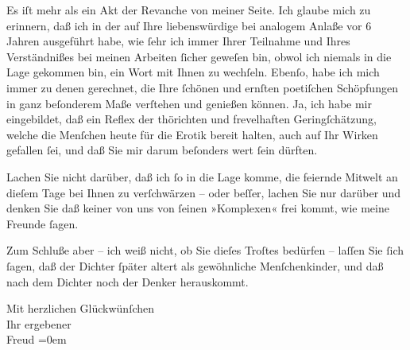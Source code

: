 \pstart
           Es iſt mehr als ein Akt der Revanche von meiner Seite. Ich glaube mich zu erinnern,
               daß ich in der \label{K_L03886-2v}\label{K_L03886-2} auf Ihre liebenswürdige
                  \label{K_L03886-3v}\label{K_L03886-3} bei analogem Anlaße vor 6
               Jahren ausgeführt habe, wie ſehr ich immer Ihrer Teilnahme und Ihres Verständnißes
               bei meinen Arbeiten ſicher geweſen bin, obwol ich niemals in die Lage gekommen bin,
               ein Wort mit Ihnen zu wechſeln. Ebenſo, habe ich mich immer zu denen gerechnet, die
               Ihre ſchönen und ernſten poetiſchen Schöpfungen in ganz beſonderem Maße verſtehen und
               genießen können. Ja, ich habe mir eingebildet, daß ein Reflex der thörichten und
               frevelhaften Gering{\pb}ſchätzung, welche die Menſchen
               heute für die Erotik bereit halten, auch auf Ihr Wirken gefallen ſei, und daß Sie mir
               darum beſonders wert ſein dürften.\pend
           
\pstart
           Lachen Sie nicht darüber, daß ich ſo in die Lage komme, die feiernde Mitwelt an
               dieſem Tage bei Ihnen zu verſchwärzen – oder beſſer, lachen Sie nur darüber und
               denken Sie daß keiner von uns von ſeinen »Komplexen« frei kommt, wie meine Freunde
               ſagen.\pend
           
\pstart
           Zum Schluße aber – ich weiß nicht, ob Sie dieſes Troſtes bedürfen – laſſen Sie ſich
               ſagen, daß der Dichter ſpäter altert als gewöhnliche Menſchenkinder, und daß nach dem
               Dichter noch der Denker herauskommt.\pend
           
\pstart
           Mit herzlichen Glückwünſchen{\\[\baselineskip]} Ihr ergebener{\\[\baselineskip]}\spacefill\mbox{Freud}\pend
           \leftskip=0em{}\endnumbering{}
\begin{anhang}
\end{anhang}
      